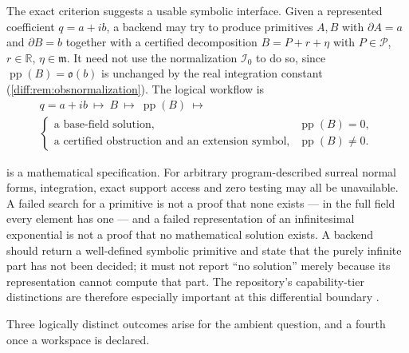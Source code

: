\documentclass[11pt,letterpaper]{article}
\numberwithin{equation}{section}
\theoremstyle{definition}
\theoremstyle{remark}
\newcommand{\R}{\mathbb R}
\newcommand{\der}{\partial}
\newcommand{\mm}{\mathfrak m}
\newcommand{\Pcl}{\mathcal P}
\newcommand{\Izero}{\mathcal I_{0}}
\newcommand{\Obs}{\mathfrak o}
\newcommand{\pp}{\operatorname{pp}}
\begin{document}
The exact criterion suggests a usable symbolic interface. Given a represented
coefficient $q=a+ib$, a backend may try to produce primitives $A,B$ with
$\der A=a$ and $\der B=b$ together with a certified decomposition
$B=P+r+\eta$ with $P\in\Pcl$, $r\in\R$, $\eta\in\mm$. It need not use the
normalization $\Izero$ to do so, since $\pp(B)=\Obs(b)$ is unchanged by the
real integration constant (\cref{diff:rem:obsnormalization}). The logical
workflow is
\begin{equation}\label{diff:eq:workflow}
\begin{gathered}
 q=a+ib\ \longmapsto\ B\ \longmapsto\ \pp(B)\ \longmapsto\\[0.25em]
 \begin{cases}
 \text{a base-field solution},&\pp(B)=0,\\
 \text{a certified obstruction and an extension symbol},&\pp(B)\neq0 .
 \end{cases}
\end{gathered}
\end{equation}

\begin{warning}
\label{diff:warn:notalgorithm}
 is a mathematical specification. For arbitrary
program-described surreal normal forms, integration, exact support access and
zero testing may all be unavailable. A failed search for a primitive is not a
proof that none exists --- in the full field every element has one --- and a
failed representation of an infinitesimal exponential is not a proof that no
mathematical solution exists. A backend should return a well-defined symbolic
primitive and state that the purely infinite part has not been decided; it
must not report ``no solution'' merely because its representation cannot
compute that part. The repository's capability-tier distinctions are therefore
especially important at this differential boundary \cite{RepoCAS}.
\end{warning}

Three logically distinct outcomes arise for the ambient question, and a fourth
once a workspace is declared.
\end{document}
